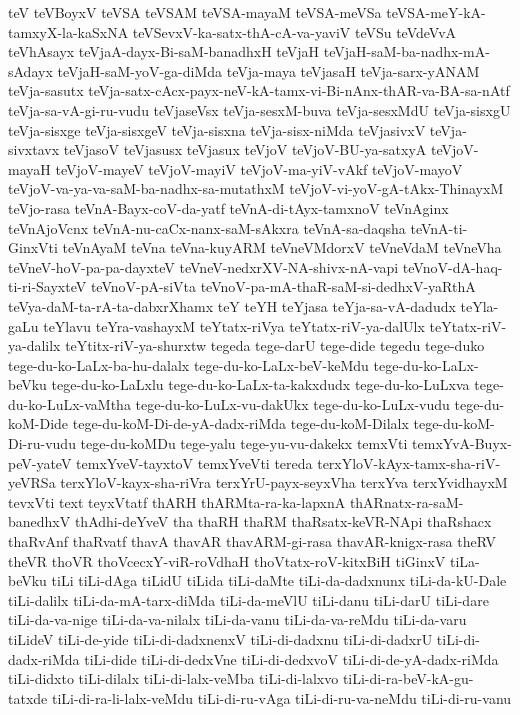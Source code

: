 {teV
teVBoyxV
teVSA
teVSAM
teVSA-mayaM
teVSA-meVSa
teVSA-meY-kA-tamxyX-la-kaSxNA
teVSevxV-ka-satx-thA-cA-va-yaviV
teVSu
teVdeVvA
teVhAsayx
teVjaA-dayx-Bi-saM-banadhxH
teVjaH
teVjaH-saM-ba-nadhx-mA-sAdayx
teVjaH-saM-yoV-ga-diMda
teVja-maya
teVjasaH
teVja-sarx-yANAM
teVja-sasutx
teVja-satx-cAcx-payx-neV-kA-tamx-vi-Bi-nAnx-thAR-va-BA-sa-nAtf
teVja-sa-vA-gi-ru-vudu
teVjaseVsx
teVja-sesxM-buva
teVja-sesxMdU
teVja-sisxgU
teVja-sisxge
teVja-sisxgeV
teVja-sisxna
teVja-sisx-niMda
teVjasivxV
teVja-sivxtavx
teVjasoV
teVjasusx
teVjasux
teVjoV
teVjoV-BU-ya-satxyA
teVjoV-mayaH
teVjoV-mayeV
teVjoV-mayiV
teVjoV-ma-yiV-vAkf
teVjoV-mayoV
teVjoV-va-ya-va-saM-ba-nadhx-sa-mutathxM
teVjoV-vi-yoV-gA-tAkx-ThinayxM
teVjo-rasa
teVnA-Bayx-coV-da-yatf
teVnA-di-tAyx-tamxnoV
teVnAginx
teVnAjoVcnx
teVnA-nu-caCx-nanx-saM-sAkxra
teVnA-sa-daqsha
teVnA-ti-GinxVti
teVnAyaM
teVna
teVna-kuyARM
teVneVMdorxV
teVneVdaM
teVneVha
teVneV-hoV-pa-pa-dayxteV
teVneV-nedxrXV-NA-shivx-nA-vapi
teVnoV-dA-haq-ti-ri-SayxteV
teVnoV-pA-siVta
teVnoV-pa-mA-thaR-saM-si-dedhxV-yaRthA
teVya-daM-ta-rA-ta-dabxrXhamx
teY
teYH
teYjasa
teYja-sa-vA-dadudx
teYla-gaLu
teYlavu
teYra-vashayxM
teYtatx-riVya
teYtatx-riV-ya-dalUlx
teYtatx-riV-ya-dalilx
teYtitx-riV-ya-shurxtw
tegeda
tege-darU
tege-dide
tegedu
tege-duko
tege-du-ko-LaLx-ba-hu-dalalx
tege-du-ko-LaLx-beV-keMdu
tege-du-ko-LaLx-beVku
tege-du-ko-LaLxlu
tege-du-ko-LaLx-ta-kakxdudx
tege-du-ko-LuLxva
tege-du-ko-LuLx-vaMtha
tege-du-ko-LuLx-vu-dakUkx
tege-du-ko-LuLx-vudu
tege-du-koM-Dide
tege-du-koM-Di-de-yA-dadx-riMda
tege-du-koM-Dilalx
tege-du-koM-Di-ru-vudu
tege-du-koMDu
tege-yalu
tege-yu-vu-dakekx
temxVti
temxYvA-Buyx-peV-yateV
temxYveV-tayxtoV
temxYveVti
tereda
terxYloV-kAyx-tamx-sha-riV-yeVRSa
terxYloV-kayx-sha-riVra
terxYrU-payx-seyxVha
terxYva
terxYvidhayxM
tevxVti
text
teyxVtatf
thARH
thARMta-ra-ka-lapxnA
thARnatx-ra-saM-banedhxV
thAdhi-deYveV
tha
thaRH
thaRM
thaRsatx-keVR-NApi
thaRshacx
thaRvAnf
thaRvatf
thavA
thavAR
thavARM-gi-rasa
thavAR-knigx-rasa
theRV
theVR
thoVR
thoVcecxY-viR-roVdhaH
thoVtatx-roV-kitxBiH
tiGinxV
tiLa-beVku
tiLi
tiLi-dAga
tiLidU
tiLida
tiLi-daMte
tiLi-da-dadxnunx
tiLi-da-kU-Dale
tiLi-dalilx
tiLi-da-mA-tarx-diMda
tiLi-da-meVlU
tiLi-danu
tiLi-darU
tiLi-dare
tiLi-da-va-nige
tiLi-da-va-nilalx
tiLi-da-vanu
tiLi-da-va-reMdu
tiLi-da-varu
tiLideV
tiLi-de-yide
tiLi-di-dadxnenxV
tiLi-di-dadxnu
tiLi-di-dadxrU
tiLi-di-dadx-riMda
tiLi-dide
tiLi-di-dedxVne
tiLi-di-dedxvoV
tiLi-di-de-yA-dadx-riMda
tiLi-didxto
tiLi-dilalx
tiLi-di-lalx-veMba
tiLi-di-lalxvo
tiLi-di-ra-beV-kA-gu-tatxde
tiLi-di-ra-li-lalx-veMdu
tiLi-di-ru-vAga
tiLi-di-ru-va-neMdu
tiLi-di-ru-vanu
}
